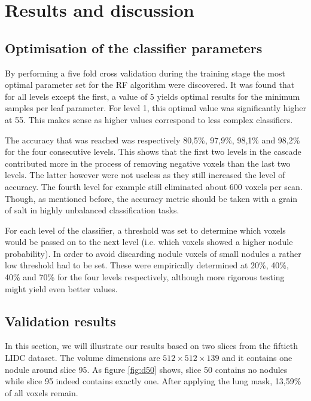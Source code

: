 \section{Results and discussion}
\subsection{Optimisation of the classifier parameters}
By performing a five fold cross validation during the training stage the most
optimal parameter set for the RF algorithm were discovered. It was found that
for all levels except the first, a value of 5 yields optimal results for the
minimum samples per leaf parameter. For level 1, this optimal value was
significantly higher at 55. This makes sense as higher values correspond to less
complex classifiers.

The accuracy that was reached was respectively 80,5\%, 97,9\%, 98,1\% and 98,2\%
for the four consecutive levels. This shows that the first two levels in the
cascade contributed more in the process of removing negative voxels than the
last two levels. The latter however were not useless as they still increased the
level of accuracy. The fourth level for example still eliminated about 600
voxels per scan. Though, as mentioned before, the accuracy metric should be
taken with a grain of salt in highly unbalanced classification tasks.

For each level of the classifier, a threshold was set to determine which voxels
would be passed on to the next level (i.e. which voxels showed a higher nodule
probability). In order to avoid discarding nodule voxels of small nodules a
rather low threshold had to be set. These were empirically determined at 20\%,
40\%, 40\% and 70\% for the four levels respectively, although more rigorous
testing might yield even better values.

\subsection{Validation results}
In this section, we will illustrate our results based on two slices from the
fiftieth LIDC dataset. The volume dimensions are $512 \times 512\times 139$ and
it contains one nodule around slice 95. As figure \ref{fig:d50} shows, slice 50
contains no nodules while slice 95 indeed contains exactly one. After applying
the lung mask, 13,59\% of all voxels remain.

